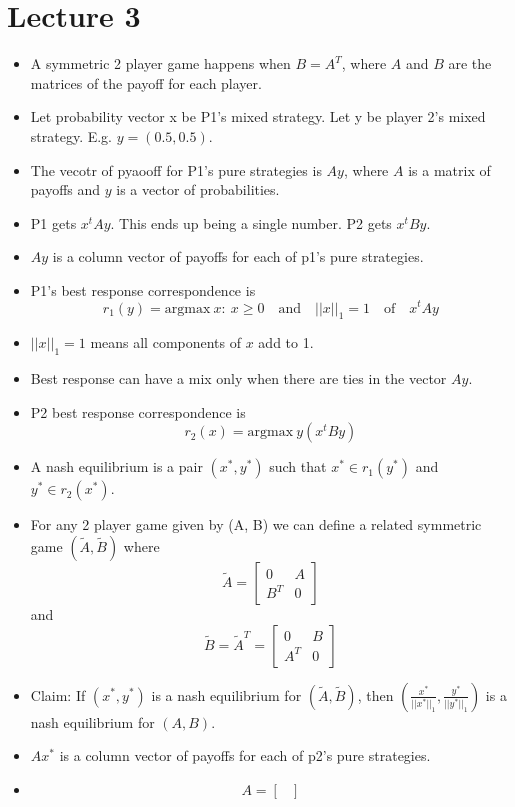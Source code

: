 \documentclass{article}
\begin{document}
\section*{Lecture 3}
\begin{itemize}
  \item A symmetric 2 player game happens when $B = A^T$, where $A$ and $B$ are the matrices of the payoff for each player.
  \item Let probability vector x be P1's mixed strategy. Let y be player 2's mixed strategy. E.g. $y=(0.5, 0.5)$.
  \item The vecotr of pyaooff for P1's pure strategies is $Ay$, where $A$ is a matrix of payoffs and $y$ is a vector of probabilities.
  \item P1 gets $x^tAy$. This ends up being a single number. P2 gets $x^tBy$.
  \item $Ay$ is a column vector of payoffs for each of p1's pure strategies.
  \item P1's best response correspondence is \[r_1(y)=\text{argmax}\  x:\ x \ge 0 \quad\text{and}\quad ||x||_1 = 1\quad\text{of}\quad x^tAy\]
  \item $||x||_1=1$ means all components of $x$ add to 1.
  \item Best response can have a mix only when there are ties in the vector $Ay$.
  \item P2 best response correspondence is \[r_2(x)=\text{argmax}\ y (x^tBy)\]
  \item A nash equilibrium is a pair $(x^*, y^*)$ such that $x^* \in r_1(y^*)$ and $y^* \in r_2(x^*)$.
  \item For any 2 player game given by (A, B) we can define a related symmetric game $(\tilde{A}, \tilde{B})$ where \[\tilde{A} = \begin{bmatrix} 0 & A \\ B^T & 0 \end{bmatrix}\] and \[\tilde{B} = \tilde{A}^T = \begin{bmatrix} 0 & B \\ A^T & 0 \end{bmatrix}\]
  \item Claim: If $(x^*, y^*)$ is a nash equilibrium for $(\tilde{A}, \tilde{B})$, then $(\frac{x^*}{||x^*||_1}, \frac{y^*}{||y^*||_1})$ is a nash equilibrium for $(A, B)$.
  \item $Ax^*$ is a column vector of payoffs for each of p2's pure strategies.
  \item \[A = \begin{bmatrix}

\end{bmatrix}\]
\end{itemize}
\end{document}
